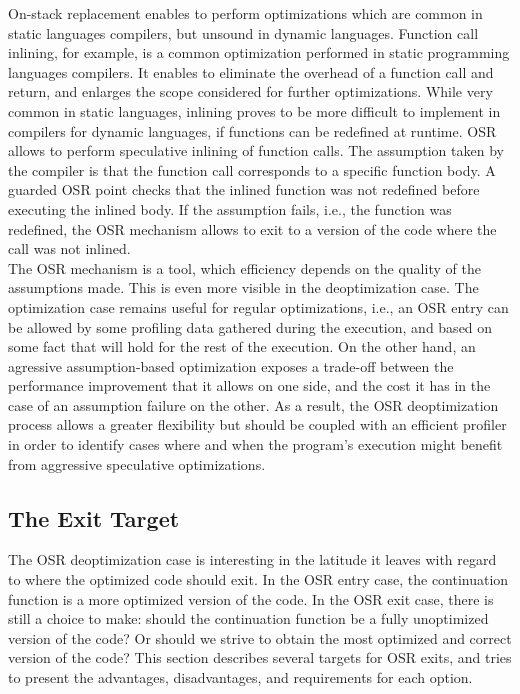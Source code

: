 On-stack replacement enables to perform optimizations which are common in static languages compilers, but unsound in dynamic languages.
Function call inlining, for example, is a common optimization performed in static programming languages compilers. 
It enables to eliminate the overhead of a function call and return, and enlarges the scope considered for further optimizations.
While very common in static languages, inlining proves to be more difficult to implement in compilers for dynamic languages, if functions can be redefined at runtime.
OSR allows to perform speculative inlining of function calls. 
The assumption taken by the compiler is that the function call corresponds to a specific function body. 
A guarded OSR point checks that the inlined function was not redefined before executing the inlined body.
If the assumption fails, i.e., the function was redefined, the OSR mechanism allows to exit to a version of the code where the call was not inlined.\\

The OSR mechanism is a tool, which efficiency depends on the quality of the assumptions made.
This is even more visible in the deoptimization case.
The optimization case remains useful for regular optimizations, i.e., an OSR entry can be allowed by some profiling data gathered during the execution, and based on some fact that will hold for the rest of the execution.
On the other hand, an agressive assumption-based optimization exposes a trade-off between the performance improvement that it allows on one side, and the cost it has in the case of an assumption failure on the other.
As a result, the OSR deoptimization process allows a greater flexibility but should be coupled with an efficient profiler in order to identify cases where and when the program's execution might benefit from aggressive speculative optimizations.\\

\subsection{The Exit Target}
The OSR deoptimization case is interesting in the latitude it leaves with regard to where the optimized code should exit.
In the OSR entry case, the continuation function is a more optimized version of the code.
In the OSR exit case, there is still a choice to make: should the continuation function be a fully unoptimized version of the code? Or should we strive to obtain the most optimized and correct version of the code?
This section describes several targets for OSR exits, and tries to present the advantages, disadvantages, and requirements for each option.\\

